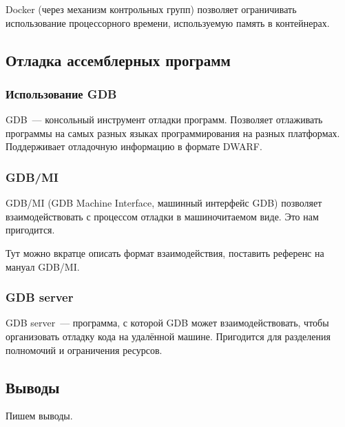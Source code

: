 \documentclass[a4paper,article,14pt]{extarticle}
\begin{document}
Docker (через механизм контрольных групп) позволяет ограничивать использование процессорного времени, используемую память в контейнерах.

\subsection{Отладка ассемблерных программ}

\subsubsection{Использование GDB}

GDB~--- консольный инструмент отладки программ. Позволяет отлаживать программы на самых разных языках программирования на разных платформах. Поддерживает отладочную информацию в формате DWARF.

\subsubsection{GDB/MI}

GDB/MI (GDB Machine Interface, машинный интерфейс GDB) позволяет взаимодействовать с процессом отладки в машиночитаемом виде. Это нам пригодится.

Тут можно вкратце описать формат взаимодействия, поставить референс на мануал GDB/MI.

\subsubsection{GDB server}

GDB server~--- программа, с которой GDB может взаимодействовать, чтобы организовать отладку кода на удалённой машине. Пригодится для разделения полномочий и ограничения ресурсов.

\subsection{Выводы}

Пишем выводы.

\end{document}
